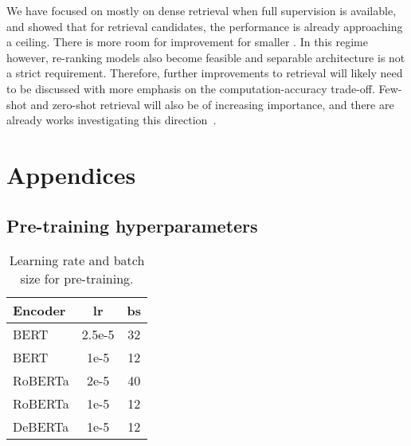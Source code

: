 \documentclass[11pt]{article}
\begin{document}
We have focused on mostly on dense retrieval when full supervision is available, and showed that for  retrieval candidates, the performance is already approaching a ceiling.  There is more room for improvement for smaller .  In this regime however, re-ranking models also become feasible and separable architecture is not a strict requirement.  Therefore, further improvements to retrieval will likely need to be discussed with more emphasis on the computation-accuracy trade-off.  Few-shot and zero-shot retrieval will also be of increasing importance, and there are already works investigating this direction~\citep{maillard2021multi,thakur2021beir}.

 



\appendix

\section{Appendices}
\label{sec:appendix}
\subsection{Pre-training hyperparameters}

\begin{table}[h!]
\centering
\begin{tabular}{lcc}
 \toprule
 \textbf{Encoder} & \textbf{lr} & \textbf{bs}  \\
\midrule
BERT & 2.5e-5 & 32 \\
BERT & 1e-5 & 12 \\
RoBERTa & 2e-5 & 40 \\
RoBERTa & 1e-5 & 12 \\
DeBERTa & 1e-5 & 12 \\

\bottomrule
\end{tabular}
\caption{Learning rate and batch size for pre-training.}
\label{tab:hyperparams}
\end{table}


 
\end{document}
